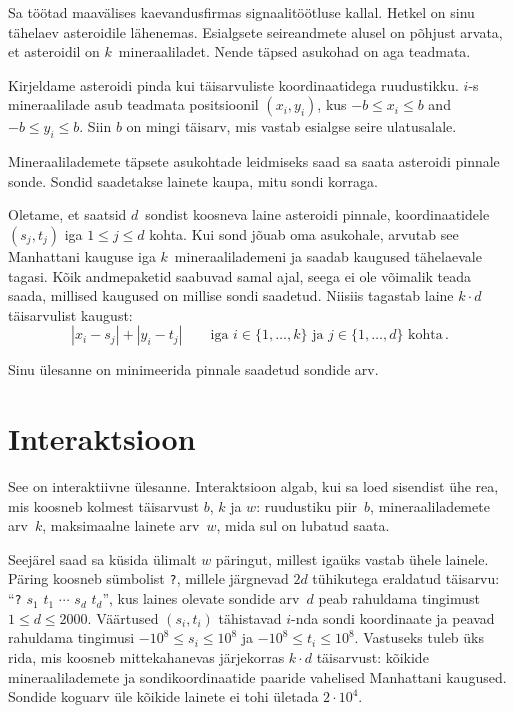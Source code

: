 

\noindent
Sa töötad maavälises kaevandusfirmas signaalitöötluse kallal. Hetkel on sinu tähelaev asteroidile lähenemas.
Esialgsete seireandmete alusel on põhjust arvata, et asteroidil on $k$~mineraaliladet. Nende täpsed asukohad on aga teadmata.

\medskip

Kirjeldame asteroidi pinda kui täisarvuliste koordinaatidega ruudustikku.
$i$-s mineraalilade asub teadmata positsioonil $(x_i, y_i)$, kus
$-b \le x_i \le b$ and $-b\le y_i \le b$. %
Siin $b$ on mingi täisarv, mis vastab esialgse seire ulatusalale.

Mineraalilademete täpsete asukohtade leidmiseks saad sa saata asteroidi pinnale sonde.
Sondid saadetakse lainete kaupa, mitu sondi korraga.

Oletame, et saatsid $d$~sondist koosneva laine asteroidi pinnale, koordinaatidele $(s_j,t_j)$
iga $1 \leq j \leq d$ kohta.
Kui sond jõuab oma asukohale, arvutab see Manhattani kauguse iga $k$~mineraalilademeni ja saadab kaugused tähelaevale tagasi.
Kõik andmepaketid saabuvad samal ajal, seega ei ole võimalik teada saada, millised kaugused on millise sondi saadetud.
Niisiis tagastab laine $k\cdot d$ täisarvulist kaugust:
\[|x_i-s_j| + |y_i - t_j| \qquad\text{iga } i \in \{1,\ldots,k\} \text{ ja } j \in\{ 1,\ldots,d\} \text{ kohta}\,.\]

Sinu ülesanne on minimeerida pinnale saadetud sondide arv.

\section*{Interaktsioon}

See on interaktiivne ülesanne.
Interaktsioon algab, kui sa loed sisendist ühe rea, mis koosneb kolmest täisarvust $b$, $k$ ja $w$:
ruudustiku piir~$b$,
mineraalilademete arv~$k$,
maksimaalne lainete arv~$w$, mida sul on lubatud saata.

Seejärel saad sa küsida ülimalt $w$ päringut, millest igaüks vastab ühele lainele.
Päring koosneb sümbolist \texttt{?}, millele järgnevad $2d$ tühikutega eraldatud täisarvu:
``\texttt{?} $s_1$ $t_1$ $\cdots$ $s_d$ $t_d$'', kus laines olevate sondide arv~$d$ peab rahuldama
tingimust $1\leq d\leq 2000$. %
Väärtused $(s_i, t_i)$ tähistavad $i$-nda sondi koordinaate ja peavad rahuldama tingimusi
$-10^8 \leq s_i \leq 10^8$ ja $-10^8 \leq t_i \leq 10^8$. %
Vastuseks tuleb üks rida, mis koosneb mittekahanevas järjekorras $k \cdot d$ täisarvust:
kõikide mineraalilademete ja sondikoordinaatide paaride vahelised Manhattani kaugused.
Sondide koguarv üle kõikide lainete ei tohi ületada
$2\cdot 10^4.$ %

